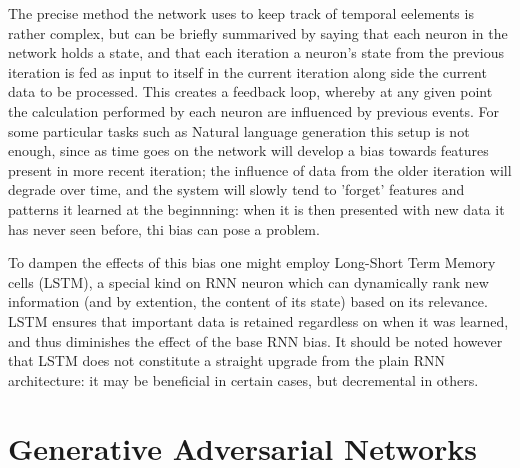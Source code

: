 The precise method the network uses to keep track of temporal eelements is rather complex, but can be briefly summarived by saying that each neuron in the network holds a state, and that each iteration a neuron's state from the previous iteration is fed as input to itself in the current iteration along side the current data to be processed.
This creates a feedback loop, whereby at any given point the calculation performed by each neuron are influenced by previous events.
 For some particular tasks such as Natural language generation this setup is not enough, since as time goes on the network will develop a bias towards features present in more recent iteration; the influence of data from the older iteration will degrade over time, and the system will slowly tend to 'forget' features and patterns it learned at the beginnning: when it is then presented with new data it has never seen before, thi bias can pose a problem.

To dampen the effects of this bias one might employ Long-Short Term Memory cells (LSTM), a special kind on RNN neuron which can dynamically rank new information (and by extention, the content of its state) based on its relevance. LSTM ensures that important data is retained regardless on when it was learned, and thus diminishes the effect of the base RNN bias.\newline
It should be noted however that LSTM does not constitute a straight upgrade from the plain RNN architecture: it may be beneficial in certain cases, but decremental in others.

\section{Generative Adversarial Networks} 
